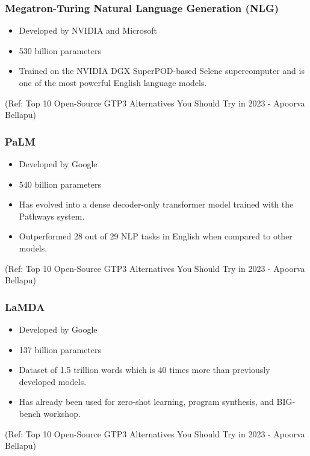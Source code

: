 \begin{frame}[fragile]\frametitle{Megatron-Turing Natural Language Generation (NLG)}

\begin{itemize}
\item Developed by NVIDIA and Microsoft
\item 530 billion parameters
\item Trained on the NVIDIA DGX SuperPOD-based Selene supercomputer and is one of the most powerful English language models.
\end{itemize}	 

\tiny{(Ref: Top 10 Open-Source GTP3 Alternatives You Should Try in 2023 - Apoorva Bellapu)}
\end{frame}

\begin{frame}[fragile]\frametitle{PaLM}

\begin{itemize}
\item Developed by Google 
\item 540 billion parameters
\item Has evolved into a dense decoder-only transformer model trained with the Pathways system.
\item Outperformed 28 out of 29 NLP tasks in English when compared to other models.
\end{itemize}	 

\tiny{(Ref: Top 10 Open-Source GTP3 Alternatives You Should Try in 2023 - Apoorva Bellapu)}
\end{frame}

\begin{frame}[fragile]\frametitle{LaMDA}

\begin{itemize}
\item Developed by Google 
\item 137 billion parameters
\item Dataset of 1.5 trillion words which is 40 times more than previously developed models. 
\item Has already been used for zero-shot learning, program synthesis, and BIG-bench workshop.
\end{itemize}	 

\tiny{(Ref: Top 10 Open-Source GTP3 Alternatives You Should Try in 2023 - Apoorva Bellapu)}
\end{frame}

